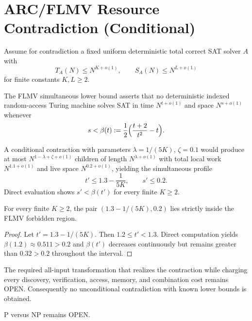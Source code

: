 
\section{ARC/FLMV Resource Contradiction (Conditional)}

Assume for contradiction a fixed uniform deterministic total correct SAT solver \(A\) with
\[
T_A(N) \le N^{K+o(1)}, \qquad S_A(N) \le N^{L+o(1)}
\]
for finite constants \(K,L \ge 2\).

The FLMV simultaneous lower bound asserts that no deterministic indexed random-access Turing machine solves SAT in time \(N^{t+o(1)}\) and space \(N^{s+o(1)}\) whenever
\[
s < \beta(t) := \frac12 \Bigl( \frac{t+2}{t^2} - t \Bigr).
\]

A conditional contraction with parameters \(\lambda = 1/(5K)\), \(\zeta = 0.1\) would produce at most \(N^{1-\lambda+\zeta+o(1)}\) children of length \(N^{\lambda+o(1)}\) with total local work \(N^{1.1+o(1)}\) and live space \(N^{0.2+o(1)}\), yielding the simultaneous profile
\[
t' \le 1.3 - \frac1{5K}, \qquad s' \le 0.2.
\]
Direct evaluation shows \(s' < \beta(t')\) for every finite \(K \ge 2\).

\begin{theorem}
\label{thm:numerical-membership}
For every finite \(K \ge 2\), the pair \((1.3 - 1/(5K), 0.2)\) lies strictly inside the FLMV forbidden region.
\end{theorem}

\begin{proof}
Let \(t' = 1.3 - 1/(5K)\). Then \(1.2 \le t' < 1.3\). Direct computation yields \(\beta(1.2) \approx 0.511 > 0.2\) and \(\beta(t')\) decreases continuously but remains greater than \(0.32 > 0.2\) throughout the interval.
\end{proof}

The required all-input transformation that realizes the contraction while charging every discovery, verification, access, memory, and combination cost remains OPEN. Consequently no unconditional contradiction with known lower bounds is obtained.

P versus NP remains OPEN.
